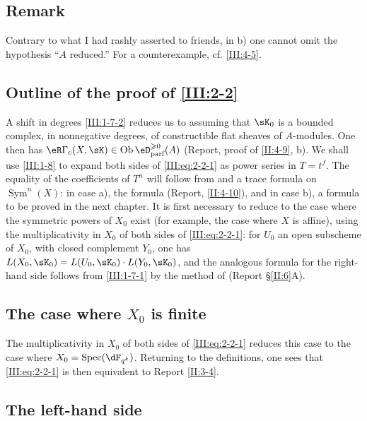\subsection{Remark}\label{III:2-7}


Contrary to what I had rashly asserted to friends, in b) one cannot omit the
hypothesis ``$A$ reduced.'' For a counterexample, cf. \ref{III:4-5}.






\subsection{Outline of the proof of \ref{III:2-2}}\label{III:2-8}

A shift in degrees \ref{III:1-7-2} reduces us to assuming that $\sK_0$ is a
bounded complex, in nonnegative degrees, of constructible flat sheaves of
$A$-modules. One then has
$\eR\Gamma_c(X,\sK)\in \ob\eD_\text{parf}^{\geqslant 0}(A)$ (Report, proof of
\ref{II:4-9}, b). We shall use \ref{III:1-8} to expand both sides of
\eqref{III:eq:2-2-1} as power series in $T=t^f$. The equality of the
coefficients of $T^n$ will follow from \cite[XVII 5.5.21]{sga4} and a trace
formula on $\operatorname{Sym}^n(X)$: in case a), the formula (Report,
\ref{II:4-10}), and in case b), a formula to be proved in the next chapter.
It is first necessary to reduce to the case where the symmetric powers of
$X_0$ exist (for example, the case where $X$ is affine), using the
multiplicativity in $X_0$ of both sides of \eqref{III:eq:2-2-1}: for $U_0$ an
open subscheme of $X_0$, with closed complement $Y_0$, one has
$L(X_0,\sK_0)=L(U_0,\sK_0)\cdot L(Y_0,\sK_0)$, and the analogous formula for
the right-hand side follows from \ref{III:1-7-1} by the method of (Report
\S\ref{II:6}A).






\subsection{The case where $X_0$ is finite}\label{III:2-9}

The multiplicativity in $X_0$ of both sides of \eqref{III:eq:2-2-1} reduces
this case to the case where $X_0=\spec(\dF_{q^k})$. Returning to the
definitions, one sees that \eqref{III:eq:2-2-1} is then equivalent to Report
\ref{II:3-4}.






\subsection{The left-hand side}\label{III:2-10}

